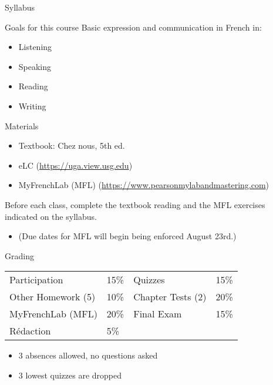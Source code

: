 \begin{frame}
  \begin{center}
    \Huge{Syllabus}
  \end{center}
\end{frame}

\begin{frame}{Goals for this course}
  Basic expression and communication in French in:
  \begin{itemize}
    \item Listening
    \item Speaking
    \item Reading
    \item Writing
  \end{itemize}
\end{frame}

\begin{frame}{Materials}
  \begin{itemize}
    \item Textbook: Chez nous, 5th ed.
    \item eLC (\url{https://uga.view.usg.edu})
    \item MyFrenchLab (MFL) (\url{https://www.pearsonmylabandmastering.com})
  \end{itemize}
  \alert{Before each class}, complete the textbook reading and the MFL exercises indicated on the syllabus.
  \begin{itemize}
    \item (Due dates for MFL will begin being enforced August 23rd.)
  \end{itemize}
\end{frame}

\begin{frame}{Grading}
  \begin{center}
    \begin{tabular}{l l | l l}
      Participation      & 15\% & Quizzes           & 15\% \\
      Other Homework (5) & 10\% & Chapter Tests (2) & 20\% \\
      MyFrenchLab (MFL)  & 20\% & Final Exam        & 15\% \\
      Rédaction          & 5\%  &                   &
    \end{tabular}
  \end{center}
  \begin{itemize}
    \item 3 absences allowed, no questions asked
    \item 3 lowest quizzes are dropped
  \end{itemize}
\end{frame}

